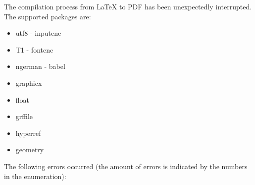 The compilation process from \LaTeX{} to PDF has been unexpectedly interrupted.
The supported packages are:
\begin{itemize}
\item utf8 - inputenc
\item T1 - fontenc
\item ngerman - babel
\item graphicx
\item float
\item grffile
\item hyperref
\item geometry
\end{itemize}

The following errors occurred (the amount of errors is indicated by the numbers in the enumeration):

